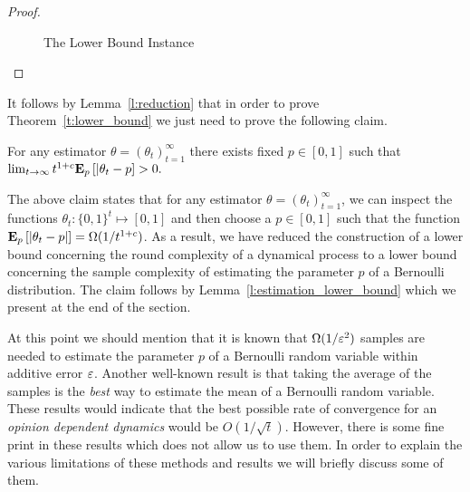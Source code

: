 \begin{proof}
\begin{figure}
    \centering
    \vspace{-10mm}
    \caption{The Lower Bound Instance} \label{fig:lb_instance}
  \end{figure}
\end{proof}
%
It follows by Lemma~\ref{l:reduction} that in order to prove Theorem~\ref{t:lower_bound} we
just need to prove the following claim.
\begin{claim}\label{cl:fixed_p}
  For any estimator $\theta = (\theta_t)_{t=1}^\infty$
  there exists fixed $p \in [0,1]$ such that
  \(
    \lim_{t \to \infty} t^{1+c} \bm{\mathrm{E}}_{p} \left[ |\theta_t - p \right] > 0.
  \)
\end{claim}
The above claim states that for any estimator $\theta=(\theta_t)_{t=1}^\infty$,
we can inspect the functions $\theta_t: \{0,1\}^t \mapsto [0,1]$ and then choose
a $p \in [0,1]$ such that the function $\bm{\mathrm{E}}_{p} \left[ |\theta_t-p| \right]= \Omega(1/t^{1+c})$. As
a result, we have reduced the construction of a lower bound concerning the round
complexity of a dynamical process to a lower bound concerning the sample complexity of
estimating the parameter $p$ of a Bernoulli distribution. The claim follows by
Lemma~\ref{l:estimation_lower_bound} which we present at the end of the section.

At this point we should mention that it is known
that $\Omega(1/\varepsilon^2)$ samples are needed to estimate the parameter $p$
of a Bernoulli random variable within additive error $\varepsilon$.
Another well-known result is that taking the average of the samples
is the \emph{best} way to estimate the mean of a Bernoulli random variable.
These results would indicate that the best possible rate of convergence
for an \emph{opinion dependent dynamics} would be $O(1/\sqrt{t})$.
However, there is some fine print in these results which does not allow us
to use them. In order to explain the various limitations of
these methods and results we will briefly discuss some of them.


